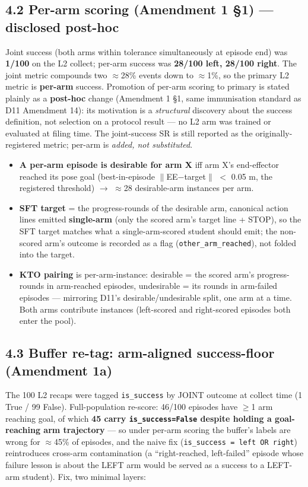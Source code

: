 \subsection*{4.2 Per-arm scoring (Amendment 1 \S1) --- disclosed post-hoc}

Joint success (both arms within tolerance simultaneously at episode end)
was \textbf{1/100} on the L2 collect; per-arm success was \textbf{28/100 left,
28/100 right}. The joint metric compounds two $\approx$28\% events down to $\approx$1\%,
so the primary L2 metric is \textbf{per-arm} success. Promotion of per-arm
scoring to primary is stated plainly as a \textbf{post-hoc} change (Amendment
1 \S1, same immunisation standard as D11 Amendment 14): its motivation is
a \emph{structural} discovery about the success definition, not selection on a
protocol result --- no L2 arm was trained or evaluated at filing time. The
joint-success SR is still reported as the originally-registered metric;
per-arm is \emph{added, not substituted}.

\begin{itemize}
\item \textbf{A per-arm episode is desirable for arm X} iff arm X's end-effector
  reached its pose goal (best-in-episode $\|$EE$-$target$\|$ $<$ 0.05 m, the
  registered threshold) $\rightarrow$ $\approx$28 desirable-arm instances per arm.
\item \textbf{SFT target} = the progress-rounds of the desirable arm, canonical
  action lines emitted \textbf{single-arm} (only the scored arm's target line +
  STOP), so the SFT target matches what a single-arm-scored student should
  emit; the non-scored arm's outcome is recorded as a flag
  (\texttt{other\_arm\_reached}), not folded into the target.
\item \textbf{KTO pairing} is per-arm-instance: desirable = the scored arm's
  progress-rounds in arm-reached episodes, undesirable = its rounds in
  arm-failed episodes --- mirroring D11's desirable/undesirable split, one
  arm at a time. Both arms contribute instances (left-scored and
  right-scored episodes both enter the pool).
\end{itemize}

\subsection*{4.3 Buffer re-tag: arm-aligned success-floor (Amendment 1a)}

The 100 L2 recaps were tagged \texttt{is\_success} by JOINT outcome at collect
time (1 True / 99 False). Full-population re-score: 46/100 episodes have
$\ge$1 arm reaching goal, of which \textbf{45 carry \texttt{is\_success=False} despite
holding a goal-reaching arm trajectory} --- so under per-arm scoring the
buffer's labels are wrong for $\approx$45\% of episodes, and the naive fix
(\texttt{is\_success = left OR right}) reintroduces cross-arm contamination (a
``right-reached, left-failed'' episode whose failure lesson is about the
LEFT arm would be served as a success to a LEFT-arm student). Fix, two
minimal layers:


